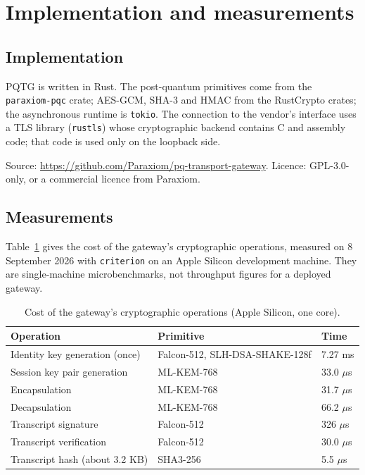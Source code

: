 \documentclass[11pt,letterpaper]{article}
\begin{document}
\section{Implementation and measurements}

\subsection{Implementation}

PQTG is written in Rust. The post-quantum primitives come from the \texttt{paraxiom-pqc} crate; AES-GCM, SHA-3 and HMAC from the RustCrypto crates; the asynchronous runtime is \texttt{tokio}. The connection to the vendor's interface uses a TLS library (\texttt{rustls}) whose cryptographic backend contains C and assembly code; that code is used only on the loopback side.

Source: \url{https://github.com/Paraxiom/pq-transport-gateway}. Licence: GPL-3.0-only, or a commercial licence from Paraxiom.

\subsection{Measurements}

Table~\ref{tab:bench} gives the cost of the gateway's cryptographic operations, measured on 8 September 2026 with \texttt{criterion} on an Apple Silicon development machine. They are single-machine microbenchmarks, not throughput figures for a deployed gateway.

\begin{table}[h]
\centering
\small
\begin{tabular}{p{4.8cm}p{5.2cm}l}
\toprule
\textbf{Operation} & \textbf{Primitive} & \textbf{Time} \\
\midrule
Identity key generation (once) & Falcon-512, SLH-DSA-SHAKE-128f & 7.27 ms \\
Session key pair generation & ML-KEM-768 & 33.0 $\mu$s \\
Encapsulation & ML-KEM-768 & 31.7 $\mu$s \\
Decapsulation & ML-KEM-768 & 66.2 $\mu$s \\
Transcript signature & Falcon-512 & 326 $\mu$s \\
Transcript verification & Falcon-512 & 30.0 $\mu$s \\
Transcript hash (about 3.2 KB) & SHA3-256 & 5.5 $\mu$s \\
\bottomrule
\end{tabular}
\caption{Cost of the gateway's cryptographic operations (Apple Silicon, one core).}
\label{tab:bench}
\end{table}
\end{document}
